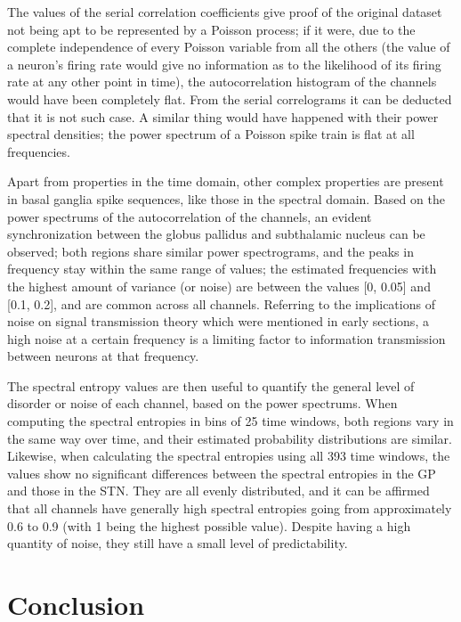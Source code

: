 \documentclass{article}
\begin{document}
The values of the serial correlation coefficients give proof of the original dataset not being apt to be represented by a Poisson process; if it were, due to the complete independence of every Poisson variable from all the others (the value of a neuron’s firing rate would give no information as to the likelihood of its firing rate at any other point in time), the autocorrelation histogram of the channels would have been completely flat. From the serial correlograms it can be deducted that it is not such case. A similar thing would have happened with their power spectral densities; the power spectrum of a Poisson spike train is flat at all frequencies.

Apart from properties in the time domain, other complex properties are present in basal ganglia spike sequences, like those in the spectral domain. Based on the power spectrums of the autocorrelation of the channels, an evident synchronization between the globus pallidus and subthalamic nucleus can be observed; both regions share similar power spectrograms, and the peaks in frequency stay within the same range of values; the estimated frequencies with the highest amount of variance (or noise) are between the values [0, 0.05] and [0.1, 0.2], and are common across all channels. Referring to the implications of noise on signal transmission theory which were mentioned in early sections, a high noise at a certain frequency is a limiting factor to information transmission between neurons at that frequency. 

The spectral entropy values are then useful to quantify the general level of disorder or noise of each channel, based on the power spectrums. When computing the spectral entropies in bins of 25 time windows, both regions vary in the same way over time, and their estimated probability distributions are similar. Likewise, when calculating the spectral entropies using all 393 time windows, the values show no significant differences between the spectral entropies in the GP and those in the STN. They are all evenly distributed, and it can be affirmed that all channels have generally high spectral entropies going from approximately 0.6 to 0.9 (with 1 being the highest possible value). Despite having a high quantity of noise, they still have a small level of predictability. 


\newpage
\section{Conclusion}
\end{document}
